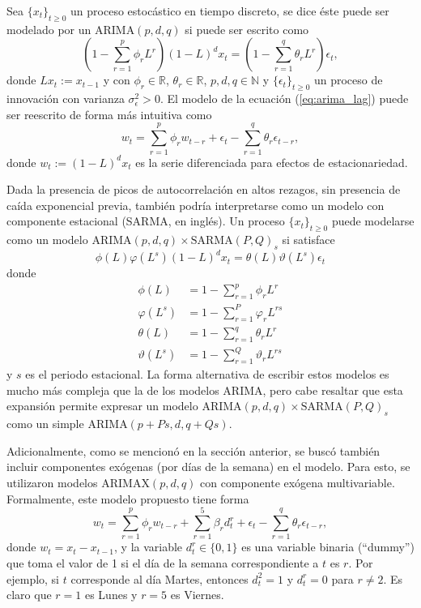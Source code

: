 \documentclass[conference]{IEEEtran}
\begin{document}
Sea $\{x_t\}_{t\geq0}$ un proceso estocástico en tiempo discreto, se dice éste puede ser modelado por un $\mathrm{ARIMA}(p,d,q)$ si puede ser escrito como
\begin{equation}\label{eq:arima_lag}
    \left(1-\sum_{r=1}^p\phi_rL^r\right)(1-L)^dx_t=\left(1-\sum_{r=1}^q\theta_rL^r\right)\epsilon_t,
\end{equation}
donde $Lx_t:=x_{t-1}$ y con $\phi_r\in\mathbb{R}$, $\theta_r\in\mathbb{R}$, $p,d,q\in\mathbb{N}$ y $\{\epsilon_t\}_{t\geq0}$ un proceso de innovación con varianza $\sigma^2_\epsilon>0$. El modelo de la ecuación (\ref{eq:arima_lag}) puede ser reescrito de forma más intuitiva como 
\begin{equation}
    w_t=\sum_{r=1}^p\phi_rw_{t-r}+\epsilon_t-\sum_{r=1}^q\theta_r\epsilon_{t-r},
\end{equation}
donde $w_t:=(1-L)^dx_t$ es la serie diferenciada para efectos de estacionariedad.

Dada la presencia de picos de autocorrelación en altos rezagos, sin presencia de caída exponencial previa, también podría interpretarse como un modelo con componente estacional (SARMA, en inglés). Un proceso $\{x_t\}_{t\geq0}$ puede modelarse como un modelo $\mathrm{ARIMA}(p,d,q)\times\mathrm{SARMA}(P,Q)_s$ si satisface
\begin{equation}
    \phi(L)\varphi(L^s)(1-L)^dx_t=\theta(L)\vartheta(L^s)\epsilon_t
\end{equation}
donde
\begin{align*}
    \phi(L)&=1-\sum_{r=1}^p\phi_rL^r\\
    \varphi(L^s)&=1-\sum_{r=1}^P\varphi_rL^{rs}\\
    \theta(L)&=1-\sum_{r=1}^q\theta_rL^r\\
    \vartheta(L^s)&=1-\sum_{r=1}^Q\vartheta_rL^{rs}
\end{align*}
y $s$ es el periodo estacional. La forma alternativa de escribir estos modelos es mucho más compleja que la de los modelos ARIMA, pero cabe resaltar que esta expansión permite expresar un modelo $\mathrm{ARIMA}(p,d,q)\times\mathrm{SARMA}(P,Q)_s$ como un simple $\mathrm{ARIMA}(p+Ps,d,q+Qs)$.

Adicionalmente, como se mencionó en la sección anterior, se buscó también incluir componentes exógenas (por días de la semana) en el modelo. Para esto, se utilizaron modelos $\mathrm{ARIMAX}(p,d,q)$ con componente exógena multivariable. Formalmente, este modelo propuesto tiene forma 
\begin{equation}
    w_t=\sum_{r=1}^p\phi_rw_{t-r}+\sum_{r=1}^5\beta_rd_t^r+\epsilon_t-\sum_{r=1}^q\theta_r\epsilon_{t-r},
\end{equation}
donde $w_t=x_t-x_{t-1}$, y la variable $d_t^r\in\{0,1\}$ es una variable binaria (``dummy'') que toma el valor de 1 si el día de la semana correspondiente a $t$ es $r$. Por ejemplo, si $t$ corresponde al día Martes, entonces $d_t^2=1$ y $d_t^r=0$ para $r\neq 2$. Es claro que $r=1$ es Lunes y $r=5$ es Viernes.
\end{document}
